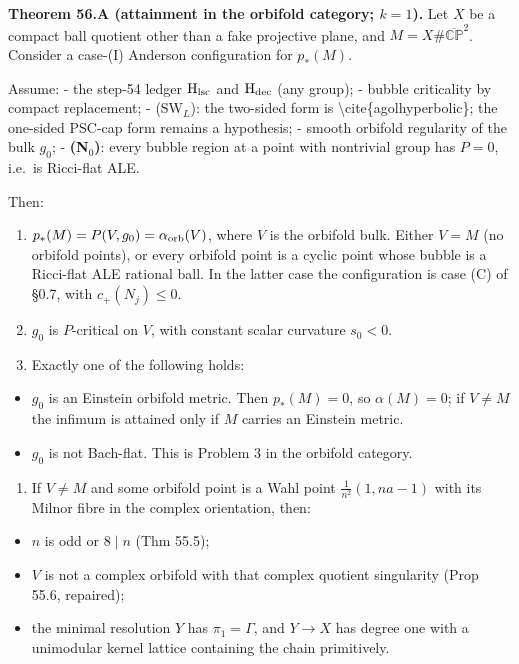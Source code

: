 \documentclass[
  10pt,
]{report}
\providecommand{\tightlist}{%
  \setlength{\itemsep}{0pt}\setlength{\parskip}{0pt}}
\begin{document}
\textbf{Theorem 56.A (attainment in the orbifold category; \(k=1\)).}
Let \(X\) be a compact ball quotient other than a fake projective plane,
and \(M=X\#\overline{\mathbb{CP}}^2\). Consider a case-(I) Anderson
configuration for \(p_*(M)\).

Assume: - the step-54 ledger \(\mathrm H_{\rm lsc}\) and
\(\mathrm H_{\rm dec}\) (any group); - bubble criticality by compact
replacement; - (SW\(_L\)): the two-sided form is
\textbackslash cite\{agolhyperbolic\}; the one-sided PSC-cap form
remains a hypothesis; - smooth orbifold regularity of the bulk \(g_0\);
- \textbf{(N\(_0\))}: every bubble region at a point with nontrivial
group has \(P=0\), i.e.~is Ricci-flat ALE.

Then:

\begin{enumerate}
\def\labelenumi{(\roman{enumi})}
\item
  \(p_*(M)=P(V,g_0)=\alpha_{\rm orb}(V)\), where \(V\) is the orbifold
  bulk. Either \(V=M\) (no orbifold points), or every orbifold point is
  a cyclic point whose bubble is a Ricci-flat ALE rational ball. In the
  latter case the configuration is case (C) of §0.7, with
  \(c_+(N_j)\le0\).
\item
  \(g_0\) is \(P\)-critical on \(V\), with constant scalar curvature
  \(s_0<0\).
\item
  Exactly one of the following holds:
\end{enumerate}

\begin{itemize}
\tightlist
\item
  \(g_0\) is an Einstein orbifold metric. Then \(p_*(M)=0\), so
  \(\alpha(M)=0\); if \(V\ne M\) the infimum is attained only if \(M\)
  carries an Einstein metric.
\item
  \(g_0\) is not Bach-flat. This is Problem 3 in the orbifold category.
\end{itemize}

\begin{enumerate}
\def\labelenumi{(\roman{enumi})}
\setcounter{enumi}{3}
\tightlist
\item
  If \(V\ne M\) and some orbifold point is a Wahl point
  \(\tfrac1{n^2}(1,na-1)\) with its Milnor fibre in the complex
  orientation, then:
\end{enumerate}

\begin{itemize}
\tightlist
\item
  \(n\) is odd or \(8\mid n\) (Thm 55.5);
\item
  \(V\) is not a complex orbifold with that complex quotient singularity
  (Prop 55.6, repaired);
\item
  the minimal resolution \(Y\) has \(\pi_1=\Gamma\), and \(Y\to X\) has
  degree one with a unimodular kernel lattice containing the chain
  primitively.
\end{itemize}
\end{document}
